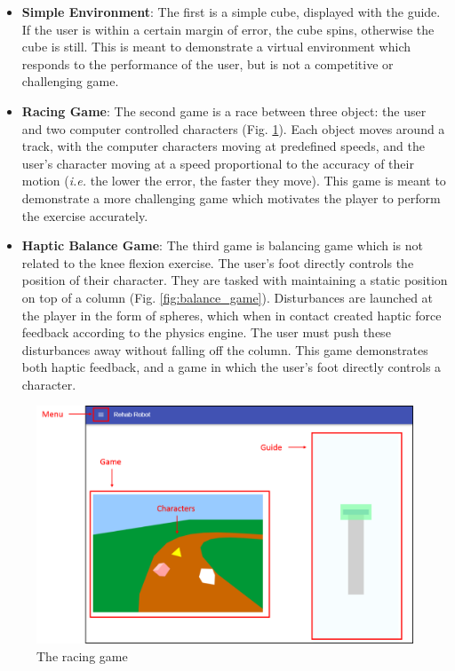 \documentclass[12pt]{report}
\begin{document}
\begin{itemize}

\item \textbf{Simple Environment}: The first is a simple cube, displayed with the guide. If the user is within a certain margin of error, the cube spins, otherwise the cube is still. This is meant to demonstrate a virtual environment which responds to the performance of the user, but is not a competitive or challenging game. 

\item \textbf{Racing Game}: The second game is a race between three object: the user and two computer controlled characters (Fig. \ref{fig:race}). Each object moves around a track, with the computer characters moving at predefined speeds, and the user's character moving at a speed proportional to the accuracy of their motion (\textit{i.e.} the lower the error, the faster they move). This game is meant to demonstrate a more challenging game which motivates the player to perform the exercise accurately. 

\item \textbf{Haptic Balance Game}: The third game is balancing game which is not related to the knee flexion exercise. The user's foot directly controls the position of their character. They are tasked with maintaining a static position on top of a column (Fig. \ref{fig:balance_game}). Disturbances are launched at the player in the form of spheres, which when in contact created haptic force feedback according to the physics engine. The user must push these disturbances away without falling off the column. This game demonstrates both haptic feedback, and a game in which the user's foot directly controls a character. 


\end{itemize}	
	
	 
	
	

	
	\begin{figure}[h] 
		\centering
		\includegraphics[width=\linewidth]{UI_game_label}
		\caption{The racing game}
		\label{fig:race}
	\end{figure} 
	
\end{document}
